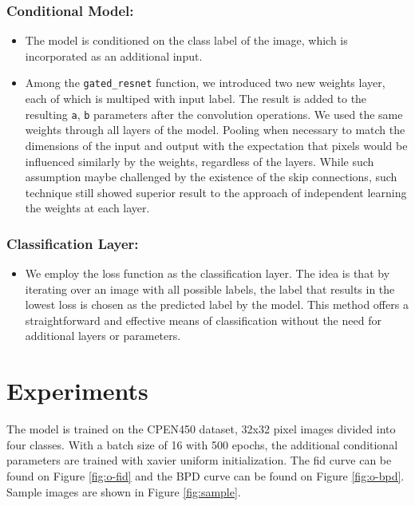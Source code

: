 \documentclass{article}
\begin{document}
    \subsubsection{Conditional Model:}
    \begin{itemize}
        \item The model is conditioned on the class label of the image, which is incorporated as an additional input. 
        \item Among the \texttt{gated\_resnet} function, we introduced two new weights layer, each of which is multiped with input label. The result is added to the resulting \texttt{a}, \texttt{b} parameters after the convolution operations. We used the same weights through all layers of the model. Pooling when necessary to match the dimensions of the input and output with the expectation that pixels would be influenced similarly by the weights, regardless of the layers. While such assumption maybe challenged by the existence of the skip connections, such technique still showed superior result to the approach of independent learning the weights at each layer.
     \end{itemize}

    \subsubsection{Classification Layer:}
    \begin{itemize}
        \item We employ the loss function as the classification layer. The idea is that by iterating over an image with all possible labels, the label that results in the lowest loss is chosen as the predicted label by the model. This method offers a straightforward and effective means of classification without the need for additional layers or parameters.
    \end{itemize}

\section{Experiments}
The model is trained on the CPEN450 dataset, 32x32 pixel images divided into four classes. With a batch size of 16 with 500 epochs, the additional conditional parameters are trained with xavier uniform initialization. The fid curve can be found on Figure \ref{fig:o-fid} and the BPD curve can be found on Figure \ref{fig:o-bpd}.
Sample images are shown in Figure \ref{fig:sample}.
\end{document}

